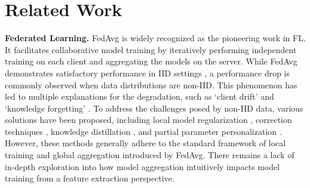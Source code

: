 \section{Related Work}
\textbf{Federated Learning.} 
FedAvg \cite{FedAvg} is widely recognized as the pioneering work in FL. It facilitates collaborative model training by iteratively performing independent training on each client and aggregating the models on the server. While FedAvg demonstrates satisfactory performance in IID settings \cite{stich2018local, woodworth2020local}, a performance drop is commonly observed when data distributions are non-IID. This phenomenon has led to multiple explanations for the degradation, such as `client drift' \cite{zhao2018federated,SCAFFOLD} and `knowledge forgetting' \cite{pFedSD}.
To address the challenges posed by non-IID data, various solutions have been proposed, including local model regularization \cite{FedProx}, correction techniques \cite{SCAFFOLD,pFedGF}, knowledge distillation \cite{pFedSD,FedNTD}, and partial parameter personalization \cite{FedBN,FedRep,FedPer,LG-FedAvg,PartialFed,ChannelFed,FedCAC,FedDecomp}. However, these methods generally adhere to the standard framework of local training and global aggregation introduced by FedAvg. There remains a lack of in-depth exploration into how model aggregation intuitively impacts model training from a feature extraction perspective.

